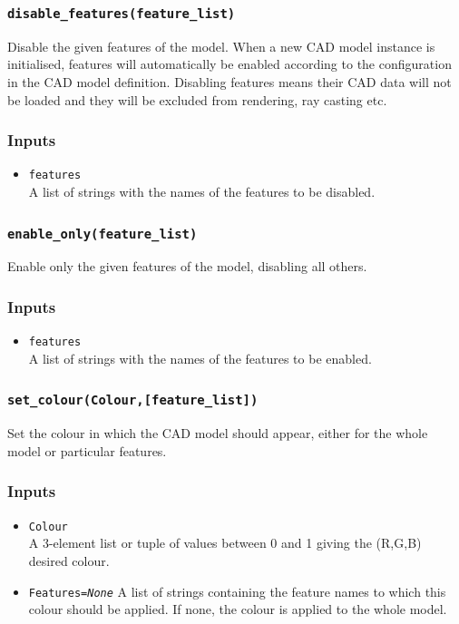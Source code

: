 \documentclass[12pt]{article}
\newcommand{\code}[1]{\texttt{#1}}
\begin{document}
\subsubsection*{\code{disable\_features(feature\_list)}}
\begin{adjustwidth}{0.5cm}{0cm}
Disable the given features of the model. When a new CAD model instance is initialised, features will automatically be enabled according to the configuration in the CAD model definition. Disabling features means their CAD data will not be loaded and they will be excluded from rendering, ray casting etc.
\subsubsection*{Inputs}
\begin{itemize}
\item{\code{features}\\A list of strings with the names of the features to be disabled.}
\end{itemize}
\end{adjustwidth}
\subsubsection*{\code{enable\_only(feature\_list)}}
\begin{adjustwidth}{0.5cm}{0cm}
Enable only the given features of the model, disabling all others.
\subsubsection*{Inputs}
\begin{itemize}
\item{\code{features}\\A list of strings with the names of the features to be enabled.}
\end{itemize}
\end{adjustwidth}
\subsubsection*{\code{set\_colour(Colour,[feature\_list])}}
\begin{adjustwidth}{0.5cm}{0cm}
Set the colour in which the CAD model should appear, either for the whole model or particular features.
\subsubsection*{Inputs}
\begin{itemize}
\item{\code{Colour}\\A 3-element list or tuple of values between 0 and 1 giving the (R,G,B) desired colour.}
\item{\code{Features={\it None}} A list of strings containing the feature names to which this colour should be applied. If none, the colour is applied to the whole model.}
\end{itemize}
\end{adjustwidth}
\end{document}
